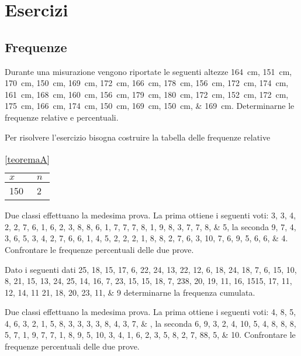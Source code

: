 \chapter{Esercizi}
%
\section{Frequenze}
\begin{esercizio}\label{teoremaA} 
Durante una misurazione vengono riportate le seguenti altezze \SIlist{164; 151; 170;  150; 169; 172; 166; 178; 156; 172; 174; 161; 168; 160; 156; 179;
	180; 172; 152; 172; 175; 166; 174; 150; 169; 150; 169}{\cm}. Determinarne  le frequenze relative e percentuali.
\end{esercizio}
\begin{soluzione}
	Per risolvere l'esercizio bisogna costruire la tabella delle frequenze relative
	\begin{table}
		\centering
		\begin{tabular}{ll}
			\toprule
			$x$ & $n$ \\
			\midrule
			150&2  \\
	\bottomrule
		\end{tabular}
		\caption{\ref{teoremaA}}
	\end{table}
\end{soluzione}
\begin{esercizio}
 Due classi effettuano la medesima prova. La prima ottiene i seguenti voti: \numlist{3; 3; 4; 2; 2; 7; 6; 1; 6; 2; 3; 8; 8; 6; 1; 7; 7; 7; 8; 1; 9; 8; 3; 7; 7; 8; 5}, la seconda \numlist{9; 7; 4; 3; 6; 5; 3; 4; 2; 7; 6; 6; 1; 4; 5; 2; 2; 2; 1; 8; 8; 2; 7; 6; 3; 10; 7; 6; 9;
	5; 6; 6; 4}. Confrontare le frequenze percentuali delle due prove.
\end{esercizio}
\begin{esercizio}
Dato i seguenti dati \numlist{25; 18; 15; 17; 6; 22; 24; 13; 22; 12; 6; 18; 24; 18; 7; 6; 15; 10; 8; 21; 15; 13;
	24; 25; 14; 16; 7; 23; 15; 15; 18; 7; 23 8; 20; 19; 11; 16; 15 15; 17; 11; 12; 14; 11
	21; 18; 20; 23; 11; 9} determinarne la frequenza cumulata.
\end{esercizio}
\begin{esercizio}
	Due classi effettuano la medesima prova. La prima ottiene i seguenti voti: \numlist{4; 8; 5; 4; 6; 3; 2; 1; 5; 8; 3; 3; 3; 3; 8; 4; 3; 7;}, la seconda \numlist{6; 9; 3; 2; 4; 10; 5; 4; 8; 8; 8; 5; 7; 1; 9; 7; 7; 1; 8; 9; 5; 10; 3; 4; 1; 6; 2; 3; 5;
		8; 2; 7; 8 8; 5; 10}. Confrontare le frequenze percentuali delle due prove.
\end{esercizio} 
